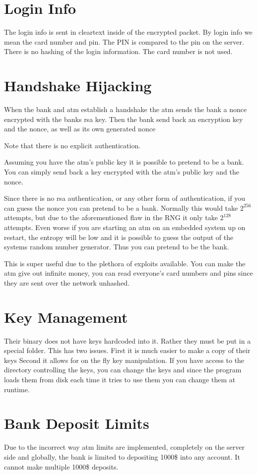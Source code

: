 \documentclass{article}
\begin{document}
\section{Login Info}

The login info is sent in cleartext inside of the encrypted packet.
By login info we mean the card number and pin.
The PIN is compared to the pin on the server. There is no hashing
of the login information.
The card number is not used.

\section{Handshake Hijacking}

When the bank and atm establish a handshake the atm sends the bank a 
nonce encrypted with the banks rsa key. Then the bank send back an
encryption key and the nonce, as well as its own generated nonce

Note that there is no explicit authentication.

Assuming you have the atm's public key it is possible to pretend to be a bank. You can simply send back a key encrypted with the atm's public key and the nonce.

Since there is no rsa authentication, or any other form of authentication,
if you can guess the nonce you can pretend to be a bank. Normally this would
take $2^256$ attempts, but due to the aforementioned flaw in the RNG it only
take $2^128$ attempts. Even worse if you are starting an atm on an embedded
system up on restart, the entropy will be low and it is possible to guess
the output of the systems random number generator. Thus you can pretend
to be the bank.

This is super useful due to the plethora of exploits available. You can 
make the atm give out infinite money, you can read everyone's card numbers 
and pins since they are sent over the network unhashed.

\section{Key Management}

Their binary does not have keys hardcoded into it. Rather they must be put in a special folder. This has two issues. First it is much easier to make a copy of their keys
Second it allows for on the fly key manipulation. If you have access to the directory controlling the keys, you can change the keys and since the program loads them from disk each time it tries to use them you can change them at runtime.

\section{Bank Deposit Limits}
Due to the incorrect way atm limits are implemented, completely on the server side and globally, the bank is limited to depositing 1000\$ into any account. It cannot make multiple 1000\$ deposits.
\end{document}
